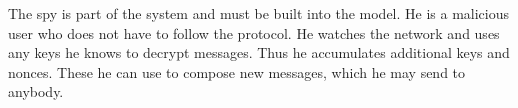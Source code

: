 \begin{isabellebody}
%
\endisatagproof
{\isafoldproof}%
%
\isadelimproof
%
\endisadelimproof
%
\isadelimproof
%
\endisadelimproof
%
\isatagproof
%
\endisatagproof
{\isafoldproof}%
%
\isadelimproof
%
\endisadelimproof
%
\isadelimproof
%
\endisadelimproof
%
\isatagproof
%
\endisatagproof
{\isafoldproof}%
%
\isadelimproof
%
\endisadelimproof
%
\isadelimproof
%
\endisadelimproof
%
\isatagproof
%
\endisatagproof
{\isafoldproof}%
%
\isadelimproof
%
\endisadelimproof
%
\isadelimproof
%
\endisadelimproof
%
\isatagproof
%
\endisatagproof
{\isafoldproof}%
%
\isadelimproof
%
\endisadelimproof
%
\isadelimproof
%
\endisadelimproof
%
\isatagproof
%
\endisatagproof
{\isafoldproof}%
%
\isadelimproof
%
\endisadelimproof
%
\isadelimproof
%
\endisadelimproof
%
\isatagproof
%
\endisatagproof
{\isafoldproof}%
%
\isadelimproof
%
\endisadelimproof
%
\isadelimproof
%
\endisadelimproof
%
\isatagproof
%
\endisatagproof
{\isafoldproof}%
%
\isadelimproof
%
\endisadelimproof
%
\isadelimproof
%
\endisadelimproof
%
\isatagproof
%
\endisatagproof
{\isafoldproof}%
%
\isadelimproof
%
\endisadelimproof
%
\isamarkuptrue%
%
\begin{isamarkuptext}%
The spy is part of the system and must be built into the model.  He is
a malicious user who does not have to follow the protocol.  He
watches the network and uses any keys he knows to decrypt messages.
Thus he accumulates additional keys and nonces.  These he can use to
compose new messages, which he may send to anybody.  


\end{isamarkuptext}
\end{isabellebody}
